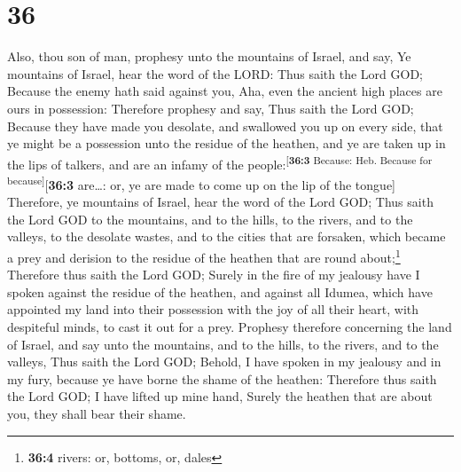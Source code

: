 \hypertarget{section-35}{%
\section{36}\label{section-35}}

 Also, thou son of man, prophesy unto the mountains of
Israel, and say, Ye mountains of Israel, hear the word of the LORD:
 Thus saith the Lord GOD; Because the enemy hath said
against you, Aha, even the ancient high places are ours in possession:
 Therefore prophesy and say, Thus saith the Lord GOD;
Because they have made you desolate, and swallowed you up on every side,
that ye might be a possession unto the residue of the heathen, and ye
are taken up in the lips of talkers, and are an infamy of the
people:\textsuperscript{{[}\textbf{36:3} Because: Heb. Because for
because{]}}{[}\textbf{36:3} are\ldots: or, ye are made to come up on the
lip of the tongue{]}  Therefore, ye mountains of Israel,
hear the word of the Lord GOD; Thus saith the Lord GOD to the mountains,
and to the hills, to the rivers, and to the valleys, to the desolate
wastes, and to the cities that are forsaken, which became a prey and
derision to the residue of the heathen that are round about;\footnote{\textbf{36:4}
  rivers: or, bottoms, or, dales}  Therefore thus saith
the Lord GOD; Surely in the fire of my jealousy have I spoken against
the residue of the heathen, and against all Idumea, which have appointed
my land into their possession with the joy of all their heart, with
despiteful minds, to cast it out for a prey.  Prophesy
therefore concerning the land of Israel, and say unto the mountains, and
to the hills, to the rivers, and to the valleys, Thus saith the Lord
GOD; Behold, I have spoken in my jealousy and in my fury, because ye
have borne the shame of the heathen:  Therefore thus saith
the Lord GOD; I have lifted up mine hand, Surely the heathen that are
about you, they shall bear their shame.


